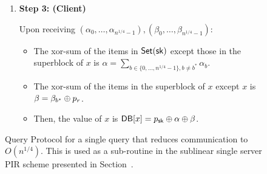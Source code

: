 \begin{figure}[p]
\begin{minipage}{\textwidth}
\begin{mdframed}
\begin{enumerate}[leftmargin=5mm,itemsep=1pt]
\begin{enumerate}
                    \item Return $(\alpha_0,\dots,\alpha_{n^{1/4}-1}),
                    (\beta_0,\dots,\beta_{n^{1/4}-1})$ to the client.
                \end{enumerate}
                
                
                \item 
               {\bf Step 3: (Client)}
               
               Upon receiving $(\alpha_0,\dots,\alpha_{n^{1/4}-1}),
               (\beta_0,\dots,\beta_{n^{1/4}-1})$:
                \begin{itemize}[leftmargin=5mm,itemsep=1pt]
                    \item 
                    The xor-sum of the items in $\mathsf{Set}(\mathsf{sk})$ except those in the
                    superblock of $x$ is
                    $\alpha=\sum_{b\in\{0,\dots,n^{1/4}-1\},b\ne b^*}\alpha_b$.
                    
                    \item The xor-sum of the items in the superblock of $x$
                    except $x$ is $\beta=\beta_{b^*}\oplus p_r$.
                    
                    \item Then, the value of $x$ is
                    $\mathsf{DB}[x]=p_{\mathsf{sk}}\oplus\alpha\oplus\beta$.
                \end{itemize}
            \end{enumerate}
        \end{mdframed}
    \end{minipage}
    \caption{Query Protocol for a single query that reduces communication to
    $O(n^{1/4})$. This is used as a sub-routine in the sublinear single server
    PIR scheme presented in Section~.}
    \label{fig:single-query}
\end{figure}



